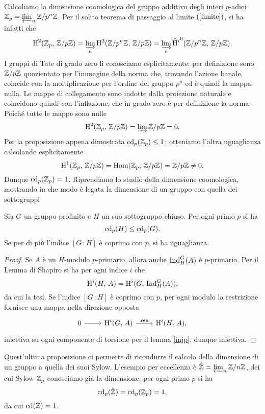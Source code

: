 Calcoliamo la dimensione coomologica del gruppo additivo degli interi $ p $-adici $ \mathbb{Z}_p = \varprojlim_n \mathbb{Z}/p^n\mathbb{Z} $. Per il solito teorema di passaggio al limite $ (\ref{limite}) $, si ha infatti che 
\[ \operatorname{H}^2(\mathbb{Z}_p , \, \mathbb{Z}/p\mathbb{Z}) = \varinjlim_n \operatorname{H}^2(\mathbb{Z}/p^n\mathbb{Z}, \, \mathbb{Z}/p\mathbb{Z}) = \varinjlim_n \operatorname{\widehat{H}^\mathnormal{i}}^0(\mathbb{Z}/p^n\mathbb{Z}, \, \mathbb{Z}/p\mathbb{Z}). \]
I gruppi di Tate di grado zero li conosciamo esplicitamente: per definizione sono $ \mathbb{Z}/p\mathbb{Z} $ quozientato per l'immagine della norma che, trovando l'azione banale, coincide con la moltiplicazione per l'ordine del gruppo $ p^n $ ed è quindi la mappa nulla. Le mappe di collegamento sono indotte dalla proiezione naturale e coincidono quindi con l'inflazione, che in grado zero è per definizione la norma. Poiché tutte le mappe sono nulle
\[ \operatorname{H}^2(\mathbb{Z}_p , \, \mathbb{Z}/p\mathbb{Z}) = \varinjlim \mathbb{Z}/p\mathbb{Z} = 0. \]
Per la proposizione appena dimostrata $ \operatorname{cd}_p(\mathbb{Z}_p) \leq 1 $; otteniamo l'altra uguaglianza calcolando esplicitamente $$  \operatorname{H}^1(\mathbb{Z}_p , \, \mathbb{Z}/p\mathbb{Z}) = \operatorname{Hom}(\mathbb{Z}_p , \, \mathbb{Z}/p\mathbb{Z}) = \mathbb{Z}/p\mathbb{Z} \neq 0.  $$
Dunque $ \operatorname{cd}_p(\mathbb{Z}_p) = 1 $.
Riprendiamo lo studio della dimensione coomologica, mostrando in che modo è legata la dimensione di un gruppo con quella dei sottogruppi

\begin{proposition}\label{cd2}
	Sia $ G $ un gruppo profinito e $ H $ un suo sottogruppo chiuso. Per ogni primo $ p $ si ha
	\[ \operatorname{cd}_p(H) \leq \operatorname{cd}_p(G). \]
	Se per di più l'indice $ [G\,\colon H] $ è coprimo con $ p $, si ha uguaglianza.
\end{proposition}
\begin{proof}
	Se $ A $ è un $ H $-modulo $ p $-primario, allora anche $ \operatorname{Ind}_H^G(A) $ è $ p $-primario. Per il Lemma di Shapiro si ha per ogni indice $ i $ che
	\[ \operatorname{H}^i(H, \, A) = \operatorname{H}^i(G, \, \operatorname{Ind}_H^G(A)),  \]
	da cui la tesi. Se l'indice $ [G\,\colon H] $ è coprimo con $ p $, per ogni modulo la restrizione fornisce una mappa nella direzione opposta
	\[\begin{tikzcd}
	0 \rar & \HH^i(G, \, A) \rar["\Res"] & \HH^i(H, \, A),
	\end{tikzcd}  \]
	iniettiva su ogni componente di torsione per il lemma \ref{injp}, dunque iniettiva.
\end{proof}

Quest'ultima proposizione ci permette di ricondurre il calcolo della dimensione di un gruppo a quella dei suoi Sylow. L'esempio per eccellenza è $ \hat{\mathbb{Z}} = \varprojlim_n \mathbb{Z}/n\mathbb{Z} $, dei cui Sylow $ \mathbb{Z}_p$ conosciamo già la dimensione: per ogni primo $ p $ si ha
\[ \operatorname{cd}_p(\hat{\mathbb{Z}}) = \operatorname{cd}_p(\mathbb{Z}_p) = 1, \]
da cui $ \operatorname{cd}(\hat{\mathbb{Z}})=1 $.\\


